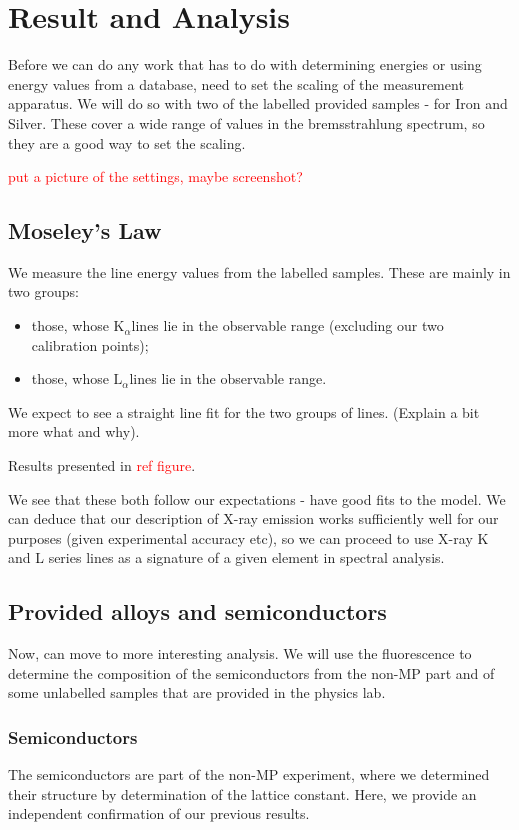 \documentclass[11pt,a4paper,twoside,onecolumn]{article}
\newcommand{\reminder}[1]{\textcolor{red}{#1}}
\newcommand{\Kalpha}{$\mathrm{K}_\alpha$}
\newcommand{\Lalpha}{$\mathrm{L}_\alpha$}
\begin{document}
\section{Result and Analysis}
Before we can do any work that has to do with determining energies or using energy values from a database, need to set the scaling of the measurement apparatus. We will do so with two of the labelled provided samples - for Iron and Silver. These cover a wide range of values in the bremsstrahlung spectrum, so they are a good way to set the scaling. 

\reminder{put a picture of the settings, maybe screenshot?}

\subsection{Moseley's Law}
We measure the line energy values from the labelled samples. These are mainly in two groups:
\begin{itemize}
    \item those, whose \Kalpha lines lie in the observable range (excluding our two calibration points);
    \item those, whose \Lalpha lines lie in the observable range.
\end{itemize}
We expect to see a straight line fit for the two groups of lines. (Explain a bit more what and why).

Results presented in \reminder{ref figure}.

We see that these both follow our expectations - have good fits to the model. We can deduce that our description of X-ray emission works sufficiently well for our purposes (given experimental accuracy etc), so we can proceed to use X-ray K and L series lines as a signature of a given element in spectral analysis.

\subsection{Provided alloys and semiconductors}
Now, can move to more interesting analysis. We will use the fluorescence to determine the composition of the semiconductors from the non-MP part and of some unlabelled samples that are provided in the physics lab.

\subsubsection{Semiconductors}
The semiconductors are part of the non-MP experiment, where we determined their structure by determination of the lattice constant. Here, we provide an independent confirmation of our previous results. 
\end{document}
